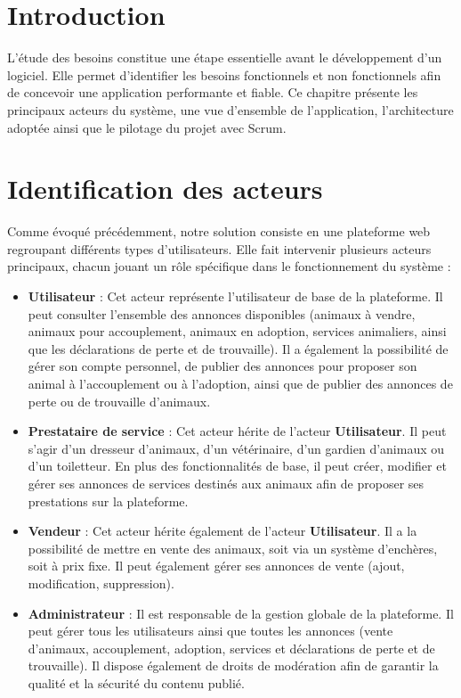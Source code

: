 \section{Introduction} 
L’étude des besoins constitue une étape essentielle avant le développement d’un logiciel. Elle permet d’identifier les besoins fonctionnels et non fonctionnels afin de concevoir une application performante et fiable. Ce chapitre présente les principaux acteurs du système, une vue d’ensemble de l’application, l’architecture adoptée ainsi que le pilotage du projet avec Scrum.
\section{Identification des acteurs} 
Comme évoqué précédemment, notre solution consiste en une plateforme web regroupant différents types d’utilisateurs. Elle fait intervenir plusieurs acteurs principaux, chacun jouant un rôle spécifique dans le fonctionnement du système : 
\begin{itemize}

\item \textbf{Utilisateur} : Cet acteur représente l’utilisateur de base de la plateforme. Il peut consulter l’ensemble des annonces disponibles (animaux à vendre, animaux pour accouplement, animaux en adoption, services animaliers, ainsi que les déclarations de perte et de trouvaille). Il a également la possibilité de gérer son compte personnel, de publier des annonces pour proposer son animal à l’accouplement ou à l’adoption, ainsi que de publier des annonces de perte ou de trouvaille d’animaux.

\item \textbf{Prestataire de service} : Cet acteur hérite de l’acteur \textbf{Utilisateur}. Il peut s’agir d’un dresseur d’animaux, d’un vétérinaire, d’un gardien d’animaux ou d’un toiletteur. En plus des fonctionnalités de base, il peut créer, modifier et gérer ses annonces de services destinés aux animaux afin de proposer ses prestations sur la plateforme.

\item \textbf{Vendeur} : Cet acteur hérite également de l’acteur \textbf{Utilisateur}. Il a la possibilité de mettre en vente des animaux, soit via un système d’enchères, soit à prix fixe. Il peut également gérer ses annonces de vente (ajout, modification, suppression).

\item \textbf{Administrateur} : Il est responsable de la gestion globale de la plateforme. Il peut gérer tous les utilisateurs ainsi que toutes les annonces (vente d’animaux, accouplement, adoption, services et déclarations de perte et de trouvaille). Il dispose également de droits de modération afin de garantir la qualité et la sécurité du contenu publié.

\end{itemize}

